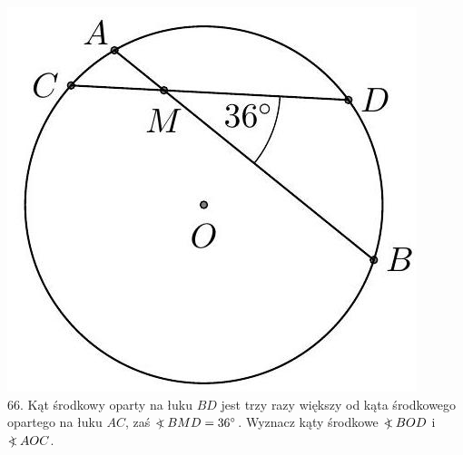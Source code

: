 \documentclass[10pt]{article}
\newcommand\Varangle{\mathop{{<\!\!\!\!\!\text{\small)}}\:}\nolimits}
\begin{document}
\includegraphics[max width=\textwidth, center]{2024_11_21_71f62bd117d375398909g-194}\\
66. Kąt środkowy oparty na łuku \(B D\) jest trzy razy większy od kąta środkowego opartego na łuku \(A C\), zaś \(\Varangle B M D=36^{\circ}\). Wyznacz kąty środkowe \(\Varangle B O D\) i \(\Varangle A O C\).
\end{document}
